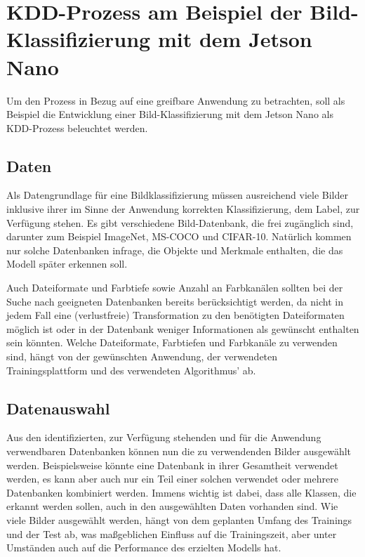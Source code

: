\section{KDD-Prozess am Beispiel der Bild-Klassifizierung mit dem Jetson Nano} \label{BeispielKDD}

Um den Prozess in Bezug auf eine greifbare Anwendung zu betrachten, soll als Beispiel die Entwicklung einer Bild-Klassifizierung mit dem Jetson Nano als KDD-Prozess beleuchtet werden.

\subsection{Daten}


Als Datengrundlage für eine Bildklassifizierung müssen ausreichend viele Bilder inklusive ihrer im Sinne der Anwendung korrekten Klassifizierung, dem Label, zur Verfügung stehen. Es gibt verschiedene Bild-Datenbank, die frei zugänglich sind, darunter zum Beispiel ImageNet, MS-COCO und CIFAR-10. Natürlich kommen nur solche Datenbanken infrage, die Objekte und Merkmale enthalten, die das Modell später erkennen soll. \cite{Deng:2009,Deng:2012,Schutten:2016,Agarap:2018b} 

Auch Dateiformate und Farbtiefe sowie Anzahl an Farbkanälen sollten bei der Suche nach geeigneten Datenbanken bereits berücksichtigt werden, da nicht in jedem Fall eine (verlustfreie) Transformation zu den benötigten Dateiformaten möglich ist oder in der Datenbank weniger Informationen als gewünscht enthalten sein könnten. Welche Dateiformate, Farbtiefen und Farbkanäle zu verwenden sind, hängt von der gewünschten Anwendung, der verwendeten Trainingsplattform und des verwendeten Algorithmus' ab.

\subsection{Datenauswahl}

Aus den identifizierten, zur Verfügung stehenden und für die Anwendung verwendbaren Datenbanken können nun die zu verwendenden Bilder ausgewählt werden. Beispielsweise könnte eine Datenbank in ihrer Gesamtheit verwendet werden, es kann aber auch nur ein Teil einer solchen verwendet oder mehrere Datenbanken kombiniert werden. Immens wichtig ist dabei, dass alle Klassen, die erkannt werden sollen, auch in den ausgewählten Daten vorhanden sind. Wie viele Bilder ausgewählt werden, hängt von dem geplanten Umfang des Trainings und der Test ab, was maßgeblichen Einfluss auf die Trainingszeit, aber unter Umständen auch auf die Performance des erzielten Modells hat. 


